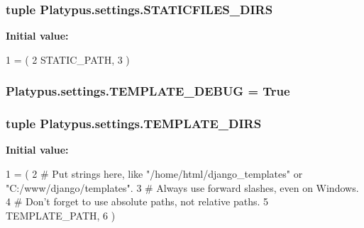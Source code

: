 \subsubsection[{S\+T\+A\+T\+I\+C\+F\+I\+L\+E\+S\+\_\+\+D\+I\+R\+S}]{\setlength{\rightskip}{0pt plus 5cm}tuple Platypus.\+settings.\+S\+T\+A\+T\+I\+C\+F\+I\+L\+E\+S\+\_\+\+D\+I\+R\+S}\label{namespace_platypus_1_1settings_a57cbf107a021ecf8c4ef636af09fd903}
{\bfseries Initial value\+:}
\begin{DoxyCode}
1 = (
2     STATIC\_PATH,
3 )
\end{DoxyCode}
\subsubsection[{T\+E\+M\+P\+L\+A\+T\+E\+\_\+\+D\+E\+B\+U\+G}]{\setlength{\rightskip}{0pt plus 5cm}Platypus.\+settings.\+T\+E\+M\+P\+L\+A\+T\+E\+\_\+\+D\+E\+B\+U\+G = True}\label{namespace_platypus_1_1settings_aa8974c188a16969cc612e68b0a562931}
\subsubsection[{T\+E\+M\+P\+L\+A\+T\+E\+\_\+\+D\+I\+R\+S}]{\setlength{\rightskip}{0pt plus 5cm}tuple Platypus.\+settings.\+T\+E\+M\+P\+L\+A\+T\+E\+\_\+\+D\+I\+R\+S}\label{namespace_platypus_1_1settings_ab156d619697e9ec9f9d435032956bc2c}
{\bfseries Initial value\+:}
\begin{DoxyCode}
1 = (
2     \textcolor{comment}{# Put strings here, like "/home/html/django\_templates" or "C:/www/django/templates".}
3     \textcolor{comment}{# Always use forward slashes, even on Windows.}
4     \textcolor{comment}{# Don't forget to use absolute paths, not relative paths.}
5     TEMPLATE\_PATH,
6 )
\end{DoxyCode}
